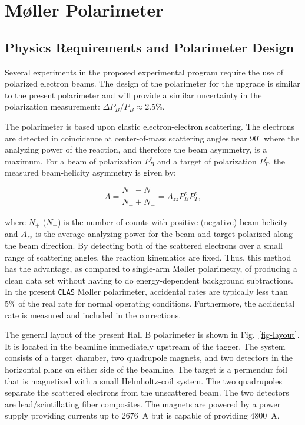 \section{M{\o}ller Polarimeter}

\subsection{Physics Requirements and Polarimeter Design}

Several experiments in the proposed experimental program require the use of
polarized electron beams.  The design of the polarimeter for the upgrade is 
similar to the present polarimeter and will provide a similar uncertainty in 
the polarization measurement: $\Delta P_B/P_B\approx$2.5\%.

The polarimeter is based upon elastic electron-electron scattering.  The
electrons are detected in coincidence at center-of-mass scattering angles
near 90$^\circ$ where the analyzing power of the reaction, and therefore
the beam asymmetry, is a maximum.  For a beam of polarization $P_B^z$ and a
target of polarization $P_T^z$, the measured beam-helicity asymmetry is
given by:

\begin{equation}
\label{eq-Asym}
A=\frac{N_+-N_-}{N_++N_-}={\bar A}_{zz}P_B^zP_T^z,
\end{equation}

\noindent
where $N_+$ ($N_-$) is the number of counts with positive (negative) beam
helicity and ${\bar A}_{zz}$ is the average analyzing power for the beam 
and target polarized along the beam direction.  By detecting both of the 
scattered electrons over a small range of scattering angles, the reaction 
kinematics are fixed.  Thus, this method has the advantage, as compared to 
single-arm M{\o}ller polarimetry, of producing a clean data set without 
having to do energy-dependent background subtractions.  In the present 
{\tt CLAS} M{\o}ller polarimeter, accidental rates are typically less than 
5\% of the real rate for normal operating conditions.  Furthermore, the 
accidental rate is measured and included in the corrections.

The general layout of the present Hall B polarimeter is shown in
Fig.~\ref{fig-layout}.  It is located in the beamline immediately upstream
of the tagger. The system consists of a target chamber, two quadrupole
magnets, and two detectors in the horizontal plane on either side of the
beamline. The target is a permendur foil that is magnetized with a small
Helmholtz-coil system. The two quadrupoles separate the scattered electrons
from the unscattered beam. The two detectors are lead/scintillating fiber
composites. The magnets are powered by a power supply providing currents up
to 2676~A but is capable of providing 4800~A.

